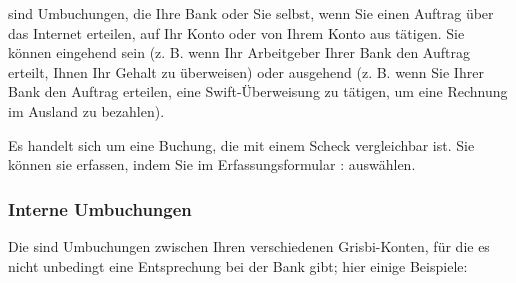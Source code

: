  sind Umbuchungen, die Ihre Bank oder Sie selbst, wenn Sie einen Auftrag über das Internet erteilen, auf Ihr Konto oder von Ihrem Konto aus tätigen. Sie können eingehend sein (z. B. wenn Ihr Arbeitgeber Ihrer Bank den Auftrag erteilt, Ihnen Ihr Gehalt zu überweisen) oder ausgehend (z. B. wenn Sie Ihrer Bank den Auftrag erteilen, eine Swift-Überweisung zu tätigen, um eine Rechnung im Ausland zu bezahlen).

Es handelt sich um eine Buchung, die mit einem Scheck vergleichbar ist. Sie können sie erfassen, indem Sie im Erfassungsformular :  auswählen.


\subsubsection{Interne Umbuchungen\label{transactions-new-transfer-internal}}

Die  sind Umbuchungen zwischen Ihren verschiedenen Grisbi-Konten, für die es nicht unbedingt eine Entsprechung bei der Bank gibt; hier einige Beispiele:

